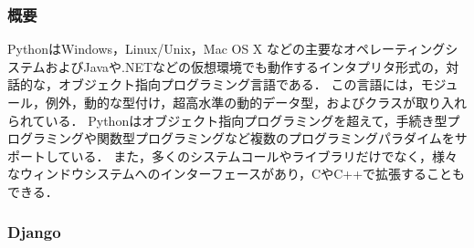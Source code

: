 \subsubsection{概要}
Python\cite{python}はWindows，Linux/Unix，Mac OS X などの主要なオペレーティングシステムおよびJavaや.NETなどの仮想環境でも動作するインタプリタ形式の，対話的な，オブジェクト指向プログラミング言語である．
この言語には，モジュール，例外，動的な型付け，超高水準の動的データ型，およびクラスが取り入れられている．
Pythonはオブジェクト指向プログラミングを超えて，手続き型プログラミングや関数型プログラミングなど複数のプログラミングパラダイムをサポートしている．
また，多くのシステムコールやライブラリだけでなく，様々なウィンドウシステムへのインターフェースがあり，C\cite{Clang}やC++\cite{cplusplus}で拡張することもできる．

\subsubsection{Django}
